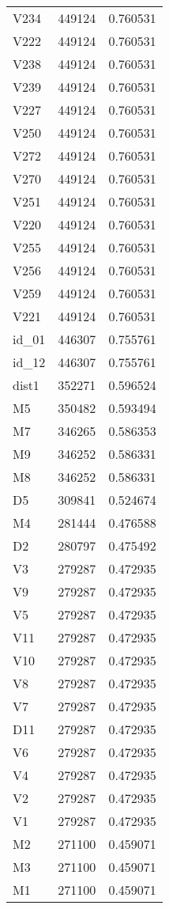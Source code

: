 \begin{tabular}{lrr}
V234 & 449124 & 0.760531 \\
V222 & 449124 & 0.760531 \\
V238 & 449124 & 0.760531 \\
V239 & 449124 & 0.760531 \\
V227 & 449124 & 0.760531 \\
V250 & 449124 & 0.760531 \\
V272 & 449124 & 0.760531 \\
V270 & 449124 & 0.760531 \\
V251 & 449124 & 0.760531 \\
V220 & 449124 & 0.760531 \\
V255 & 449124 & 0.760531 \\
V256 & 449124 & 0.760531 \\
V259 & 449124 & 0.760531 \\
V221 & 449124 & 0.760531 \\
id_01 & 446307 & 0.755761 \\
id_12 & 446307 & 0.755761 \\
dist1 & 352271 & 0.596524 \\
M5 & 350482 & 0.593494 \\
M7 & 346265 & 0.586353 \\
M9 & 346252 & 0.586331 \\
M8 & 346252 & 0.586331 \\
D5 & 309841 & 0.524674 \\
M4 & 281444 & 0.476588 \\
D2 & 280797 & 0.475492 \\
V3 & 279287 & 0.472935 \\
V9 & 279287 & 0.472935 \\
V5 & 279287 & 0.472935 \\
V11 & 279287 & 0.472935 \\
V10 & 279287 & 0.472935 \\
V8 & 279287 & 0.472935 \\
V7 & 279287 & 0.472935 \\
D11 & 279287 & 0.472935 \\
V6 & 279287 & 0.472935 \\
V4 & 279287 & 0.472935 \\
V2 & 279287 & 0.472935 \\
V1 & 279287 & 0.472935 \\
M2 & 271100 & 0.459071 \\
M3 & 271100 & 0.459071 \\
M1 & 271100 & 0.459071 \\

\end{tabular}
